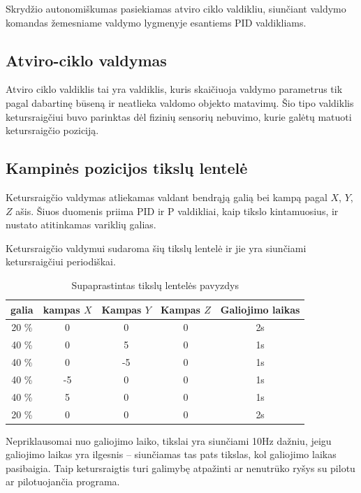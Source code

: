 \documentclass[12pt, a4paper, lithuanian, final]{article}
\begin{document}
Skrydžio autonomiškumas pasiekiamas atviro ciklo valdikliu, siunčiant valdymo komandas žemesniame valdymo lygmenyje esantiems PID valdikliams.

\subsection{Atviro-ciklo valdymas}

Atviro ciklo valdiklis tai yra valdiklis, kuris skaičiuoja valdymo parametrus tik pagal dabartinę būseną ir neatlieka valdomo objekto matavimų.
Šio tipo valdiklis ketursraigčiui buvo parinktas dėl fizinių sensorių nebuvimo, kurie galėtų matuoti ketursraigčio poziciją.

\subsection{Kampinės pozicijos tikslų lentelė}

Ketursraigčio valdymas atliekamas valdant bendrąją galią bei kampą pagal $X$, $Y$, $Z$ ašis.
Šiuos duomenis priima PID ir P valdikliai, kaip tikslo kintamuosius, ir nustato atitinkamas variklių galias.

Ketursraigčio valdymui sudaroma šių tikslų lentelė ir jie yra siunčiami ketursraigčiui periodiškai.

\begin{center}
\begin{table}[h]
\begin{tabular}{ | c | c | c | c | c | }
	\hline
	\textbf{galia} & \textbf{kampas $X$} & \textbf{Kampas $Y$} & \textbf{Kampas $Z$} & \textbf{Galiojimo laikas} \\
	\hline
	20 \% & 0\degree & 0\degree & 0\degree & 2s \\
	\hline
	40 \% & 0\degree & 5\degree & 0\degree & 1s \\
	\hline
	40 \% & 0\degree & -5\degree & 0\degree & 1s \\
	\hline
	40 \% & -5\degree & 0\degree & 0\degree & 1s \\
	\hline
	40 \% & 5\degree & 0\degree & 0\degree & 1s \\
	\hline
	20 \% & 0\degree & 0\degree & 0\degree & 2s \\
	\hline
\end{tabular}
\caption{Supaprastintas tikslų lentelės pavyzdys}
\end{table}
\end{center}

Nepriklausomai nuo galiojimo laiko, tikslai yra siunčiami 10Hz dažniu, jeigu galiojimo laikas yra ilgesnis -- siunčiamas tas pats tikslas, kol galiojimo laikas pasibaigia.
Taip ketursraigtis turi galimybę atpažinti ar nenutrūko ryšys su pilotu ar pilotuojančia programa.
\end{document}
